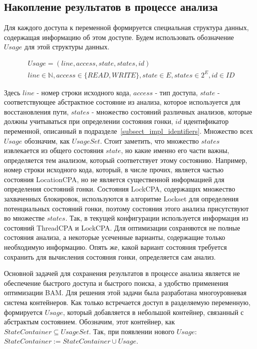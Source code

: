\subsection{Накопление результатов в процессе анализа} \label{subsect_impl_storage}

Для каждого доступа к переменной формируется специальная структура данных, содержащая информацию об этом доступе. 
Будем использовать обозначение $Usage$ для этой структуры данных.

\begin{align}
& Usage = (line, access, state, states, id) \nonumber \\ 
& line \in \mathbb{N}, access \in \{READ, WRITE\}, state \in E, states \in 2^E, id \in ID \nonumber
\end{align}

Здесь $line$ - номер строки исходного кода, $access$ - тип доступа, $state$ - соответствующее абстрактное состояние из анализа, которое используется для восстановления пути, $states$ - множество состояний различных анализов, которые должны учитываться при определении состояния гонки, $id$ идентификатор переменной, описанный в подразделе~\ref{subsect_impl_identifiers}.
Множество всех $Usage$ обозначим, как $UsageSet$. 
Стоит заметить, что множество $states$ извлекается из общего состояния $state$, но какие именно его части важны, определяется тем анализом, который соответствует этому состоянию.
Например, номер строки исходного кода, который, в числе прочих, является частью состояния LocationCPA, но не является существенной информацией для определения состояний гонки. 
Состояния LockCPA, содержащих множество захваченных блокировок, используются в алгоритме Lockset для определения потенциальных состояний гонки, поэтому состояния этого анализа присутствуют во множестве $states$. 
Так, в текущей конфигурации используется информация из состояний ThreadCPA и LockCPA. 
Для оптимизации сохраняются не полные состояния анализа, а некоторые усеченные варианты, содержащие только необходимую информацию.
Опять же, какой вариант состояния требуется сохранить для вычисления состояния гонки, определяется сам анализ.

Основной задачей для сохранения результатов в процессе анализа является не обеспечение быстрого доступа и быстрого поиска, а удобство применения оптимизации BAM. 
Для решения этой задачи была разработана многоуровневая система контейнеров. 
Как только встречается доступ в разделяемую переменную, формируется $Usage$, который добавляется в небольшой контейнер, связанный с абстрактым состоянием. Обозначим, этот контейнер, как $StateContainer \subseteq UsageSet$.
Так, при появлении нового $Usage$: $StateContainer := StateContainer \cup Usage$.

